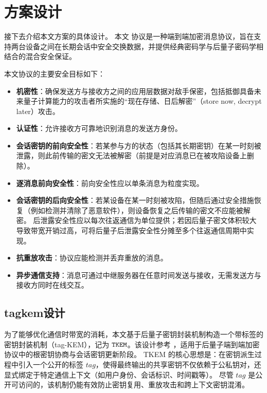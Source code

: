 \section{方案设计}
接下去介绍本文方案的具体设计。
本文 协议是一种端到端加密消息协议，旨在支持两台设备之间在长期会话中安全交换数据，并提供经典密码学与后量子密码学相结合的混合安全保证。

本文协议的主要安全目标如下：

\begin{itemize}
    \item \textbf{机密性}：确保发送方与接收方之间的应用层数据对敌手保密，包括抵御具备未来量子计算能力的攻击者所实施的“现在存储、日后解密”（store now, decrypt later）攻击。
    
    \item \textbf{认证性}：允许接收方可靠地识别消息的发送方身份。
    
    \item \textbf{会话密钥的前向安全性}：若某参与方的状态（包括其长期密钥）在某一时刻被泄露，则此前传输的密文无法被解密（前提是对应消息已在被攻陷设备上删除）。
    
    \item \textbf{逐消息前向安全性}：前向安全性应以单条消息为粒度实现。
    
    \item \textbf{会话密钥的后向安全性}：若某设备在某一时刻被攻陷，但随后通过安全措施恢复（例如检测并清除了恶意软件），则设备恢复之后传输的密文不应能被解密。  
    后泄露安全性应以每次往返通信为单位提供；若因后量子密文体积较大导致带宽开销过高，可将后量子后泄露安全性分摊至多个往返通信周期中实现。
    
    \item \textbf{抗重放攻击}：协议应能检测并丢弃重放的消息。
    
    \item \textbf{异步通信支持}：消息可通过中继服务器在任意时间发送与接收，无需发送方与接收方同时在线交互。
\end{itemize}


\subsection{tagkem设计}
为了能够优化通信时带宽的消耗，本文基于后量子密钥封装机制构造一个带标签的密钥封装机制（tag-KEM），记为 $\texttt{TKEM}$。该设计参考 \cite{abe2005tag}，适用于后量子端到端加密协议中的根密钥协商与会话密钥更新阶段。
TKEM 的核心思想是：在密钥派生过程中引入一个公开的标签 $tag$，使得最终输出的共享密钥不仅依赖于公私钥对，还显式绑定于特定通信上下文（如用户身份、会话标识、时间戳等）。
尽管 $tag$ 是公开可访问的，该机制仍能有效防止密钥复用、重放攻击和跨上下文密钥混淆。

